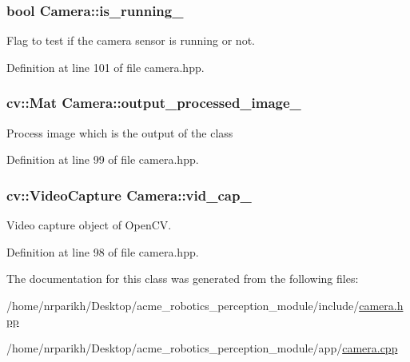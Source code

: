 \subsubsection[{\texorpdfstring{is\+\_\+running\+\_\+}{is_running_}}]{\setlength{\rightskip}{0pt plus 5cm}bool Camera\+::is\+\_\+running\+\_\+\hspace{0.3cm}{\ttfamily [private]}}\hypertarget{class_camera_a24d141601f7d0330b77b86505851bd0d}{}\label{class_camera_a24d141601f7d0330b77b86505851bd0d}


Flag to test if the camera sensor is running or not. 



Definition at line 101 of file camera.\+hpp.

\subsubsection[{\texorpdfstring{output\+\_\+processed\+\_\+image\+\_\+}{output_processed_image_}}]{\setlength{\rightskip}{0pt plus 5cm}cv\+::\+Mat Camera\+::output\+\_\+processed\+\_\+image\+\_\+\hspace{0.3cm}{\ttfamily [private]}}\hypertarget{class_camera_ae96ea8feb337852401830c24af293025}{}\label{class_camera_ae96ea8feb337852401830c24af293025}
Process image which is the output of the class 

Definition at line 99 of file camera.\+hpp.

\subsubsection[{\texorpdfstring{vid\+\_\+cap\+\_\+}{vid_cap_}}]{\setlength{\rightskip}{0pt plus 5cm}cv\+::\+Video\+Capture Camera\+::vid\+\_\+cap\+\_\+\hspace{0.3cm}{\ttfamily [private]}}\hypertarget{class_camera_a264c7dfa5dd39176aedbb742f34ba1eb}{}\label{class_camera_a264c7dfa5dd39176aedbb742f34ba1eb}


Video capture object of Open\+CV. 



Definition at line 98 of file camera.\+hpp.



The documentation for this class was generated from the following files\+:\begin{DoxyCompactItemize}
\item 
/home/nrparikh/\+Desktop/acme\+\_\+robotics\+\_\+perception\+\_\+module/include/\hyperlink{camera_8hpp}{camera.\+hpp}\item 
/home/nrparikh/\+Desktop/acme\+\_\+robotics\+\_\+perception\+\_\+module/app/\hyperlink{camera_8cpp}{camera.\+cpp}\end{DoxyCompactItemize}
